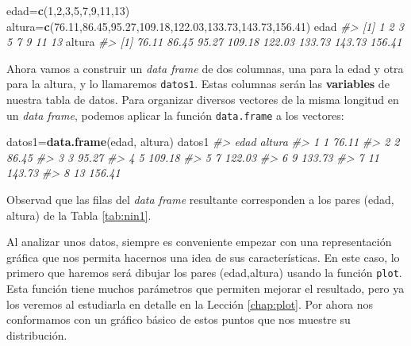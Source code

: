 \documentclass[
]{book}
\newenvironment{Shaded}{\begin{snugshade}}{\end{snugshade}}
\newcommand{\CommentTok}[1]{\textcolor[rgb]{0.56,0.35,0.01}{\textit{#1}}}
\newcommand{\DecValTok}[1]{\textcolor[rgb]{0.00,0.00,0.81}{#1}}
\newcommand{\FloatTok}[1]{\textcolor[rgb]{0.00,0.00,0.81}{#1}}
\newcommand{\KeywordTok}[1]{\textcolor[rgb]{0.13,0.29,0.53}{\textbf{#1}}}
\newcommand{\NormalTok}[1]{#1}
\theoremstyle{definition}
\theoremstyle{definition}
\theoremstyle{definition}
\theoremstyle{remark}
\begin{document}
\begin{Shaded}
\begin{Highlighting}[]
\NormalTok{edad=}\KeywordTok{c}\NormalTok{(}\DecValTok{1}\NormalTok{,}\DecValTok{2}\NormalTok{,}\DecValTok{3}\NormalTok{,}\DecValTok{5}\NormalTok{,}\DecValTok{7}\NormalTok{,}\DecValTok{9}\NormalTok{,}\DecValTok{11}\NormalTok{,}\DecValTok{13}\NormalTok{)}
\NormalTok{altura=}\KeywordTok{c}\NormalTok{(}\FloatTok{76.11}\NormalTok{,}\FloatTok{86.45}\NormalTok{,}\FloatTok{95.27}\NormalTok{,}\FloatTok{109.18}\NormalTok{,}\FloatTok{122.03}\NormalTok{,}\FloatTok{133.73}\NormalTok{,}\FloatTok{143.73}\NormalTok{,}\FloatTok{156.41}\NormalTok{)}
\NormalTok{edad}
\CommentTok{\#\textgreater{} [1]  1  2  3  5  7  9 11 13}
\NormalTok{altura}
\CommentTok{\#\textgreater{} [1]  76.11  86.45  95.27 109.18 122.03 133.73 143.73 156.41}
\end{Highlighting}
\end{Shaded}

Ahora vamos a construir un \emph{data frame} de dos columnas, una para la edad y otra para la altura, y lo llamaremos \texttt{datos1}. Estas columnas serán las \textbf{variables} de nuestra tabla de datos.
Para organizar diversos vectores de la misma longitud en un \emph{data frame}, podemos aplicar la función \texttt{data.frame} a los vectores:

\begin{Shaded}
\begin{Highlighting}[]
\NormalTok{datos1=}\KeywordTok{data.frame}\NormalTok{(edad, altura)}
\NormalTok{datos1}
\CommentTok{\#\textgreater{}   edad altura}
\CommentTok{\#\textgreater{} 1    1  76.11}
\CommentTok{\#\textgreater{} 2    2  86.45}
\CommentTok{\#\textgreater{} 3    3  95.27}
\CommentTok{\#\textgreater{} 4    5 109.18}
\CommentTok{\#\textgreater{} 5    7 122.03}
\CommentTok{\#\textgreater{} 6    9 133.73}
\CommentTok{\#\textgreater{} 7   11 143.73}
\CommentTok{\#\textgreater{} 8   13 156.41}
\end{Highlighting}
\end{Shaded}

Observad que las filas del \emph{data frame} resultante corresponden a los pares (edad, altura) de la Tabla \ref{tab:nin1}.

Al analizar unos datos, siempre es conveniente empezar con una representación gráfica que nos permita hacernos una idea de sus características. En este caso, lo primero que haremos será dibujar los pares (edad,altura) usando la función \texttt{plot}. Esta función tiene muchos parámetros que permiten mejorar el resultado, pero ya los veremos al estudiarla en detalle en la Lección \ref{chap:plot}. Por ahora nos conformamos con un gráfico básico de estos puntos que nos muestre su distribución.
\end{document}
